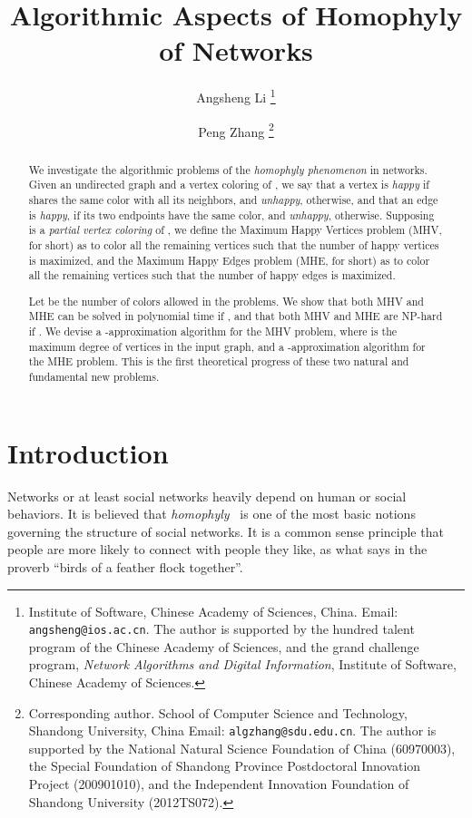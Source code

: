 \documentclass[11pt]{article}
\begin{document}
\title{Algorithmic Aspects of Homophyly of Networks}

\author{
Angsheng Li
\thanks{Institute of Software, Chinese Academy of Sciences, China.
  Email: \texttt{angsheng@ios.ac.cn}.
  The author is supported by the hundred talent program of the Chinese Academy of Sciences,
  and the grand challenge program, {\it Network Algorithms and Digital Information},
  Institute of Software, Chinese Academy of Sciences.}
\and
Peng Zhang
\thanks{Corresponding author.
  School of Computer Science and Technology, Shandong University, China
  Email: \texttt{algzhang@sdu.edu.cn}.
  The author is supported by the National Natural Science Foundation of China (60970003),
  the Special Foundation of Shandong Province Postdoctoral Innovation Project (200901010),
  and the Independent Innovation Foundation of Shandong University (2012TS072).}
}


\maketitle


\begin{abstract}
We investigate the algorithmic problems of the {\it homophyly
phenomenon} in networks. Given an undirected graph  and a vertex
coloring  of , we say that
a vertex  is {\it happy} if  shares the same color with all its
neighbors, and {\it unhappy}, otherwise, and that an edge  is
{\it happy}, if its two endpoints have the same color, and {\it unhappy},
otherwise. Supposing  is a {\it partial vertex coloring} of ,
we define the Maximum Happy Vertices problem (MHV, for
short) as to color all the remaining vertices such that the number
of happy vertices is maximized, and the Maximum Happy Edges problem
(MHE, for short) as to color all the remaining vertices such that
the number of happy edges is maximized.

Let  be the number of colors allowed in the problems.
We show that both MHV and MHE can be solved in polynomial time
if , and that both MHV and MHE are NP-hard if .
We devise a -approximation algorithm
for the MHV problem, where  is the maximum degree of vertices in
the input graph, and a -approximation algorithm for the MHE problem.
This is the first theoretical progress of these two natural and fundamental
new problems.
\end{abstract}




\section{Introduction}
\label{sec - introduction}
Networks or at least social networks heavily depend on human or
social behaviors. It is believed that {\em homophyly}~\cite[Chapter
4]{EK10} is one of the most basic notions governing the structure of
social networks. It is a common sense principle that people are more
likely to connect with people they like, as what says in the proverb
``birds of a feather flock together''.
\end{document}
